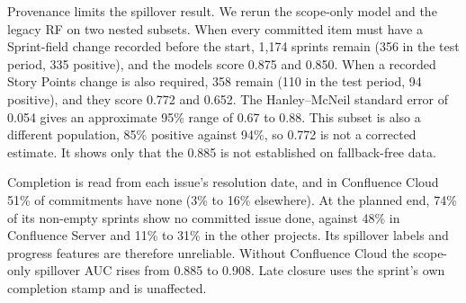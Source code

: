 \documentclass[conference]{IEEEtran}
\begin{document}
Provenance limits the spillover result. We rerun the scope-only model and the legacy RF on two nested subsets. When every committed item must have a Sprint-field change recorded before the start, 1,174 sprints remain (356 in the test period, 335 positive), and the models score 0.875 and 0.850. When a recorded Story Points change is also required, 358 remain (110 in the test period, 94 positive), and they score 0.772 and 0.652. The Hanley--McNeil \cite{r20} standard error of 0.054 gives an approximate 95\% range of 0.67 to 0.88. This subset is also a different population, 85\% positive against 94\%, so 0.772 is not a corrected estimate. It shows only that the 0.885 is not established on fallback-free data.

Completion is read from each issue's resolution date, and in Confluence Cloud 51\% of commitments have none (3\% to 16\% elsewhere). At the planned end, 74\% of its non-empty sprints show no committed issue done, against 48\% in Confluence Server and 11\% to 31\% in the other projects. Its spillover labels and progress features are therefore unreliable. Without Confluence Cloud the scope-only spillover AUC rises from 0.885 to 0.908. Late closure uses the sprint's own completion stamp and is unaffected.
\end{document}

